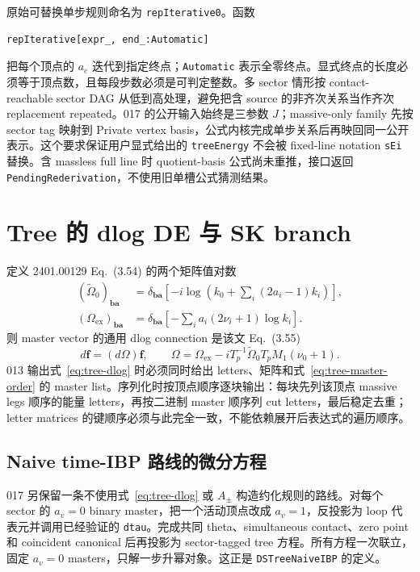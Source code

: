 ﻿\documentclass[a4paper,11pt]{article}
\begin{document}
原始可替换单步规则命名为 \texttt{repIterative0}。函数
\begin{verbatim}
repIterative[expr_, end_:Automatic]
\end{verbatim}
把每个顶点的 $a_e$ 迭代到指定终点；\texttt{Automatic} 表示全零终点。显式终点的长度必须等于顶点数，且每段步数必须是可判定整数。多 sector 情形按 contact-reachable sector DAG 从低到高处理，避免把含 source 的非齐次关系当作齐次 replacement repeated。017 的公开输入始终是三参数 $J$；massive-only family 先按 sector tag 映射到 Private vertex basis，公式内核完成单步关系后再映回同一公开表示。这个要求保证用户显式给出的 \texttt{treeEnergy} 不会被 fixed-line notation \texttt{sEi} 替换。含 massless full line 时 quotient-basis 公式尚未重推，接口返回 \texttt{PendingRederivation}，不使用旧单槽公式猜测结果。

\section{Tree 的 dlog DE 与 SK branch}

定义 2401.00129 Eq.~(3.54) 的两个矩阵值对数
\begin{align}
 (\widetilde\Omega_0)_{\bm b\bm a}
 &=\delta_{\bm b\bm a}\left[-i\log\left(k_0+\sum_i(2a_i-1)k_i\right)\right],\\
 (\Omega_{\mathrm{ex}})_{\bm b\bm a}
 &=\delta_{\bm b\bm a}\left[-\sum_i a_i(2\nu_i+1)\log k_i\right].
\end{align}
则 master vector 的通用 dlog connection 是该文 Eq.~(3.55)
\begin{equation}
 d\bm f=(d\Omega)\bm f,
 \qquad
 \Omega=\Omega_{\mathrm{ex}}
 -iT_p^{-1}\widetilde\Omega_0T_pM_1(\nu_0+1).
 \label{eq:tree-dlog}
\end{equation}
013 输出式~\eqref{eq:tree-dlog} 时必须同时给出 letters、矩阵和式~\eqref{eq:tree-master-order} 的 master list。序列化时按顶点顺序逐块输出：每块先列该顶点 massive legs 顺序的能量 letters，再按二进制 master 顺序列 cut letters，最后稳定去重；letter matrices 的键顺序必须与此完全一致，不能依赖展开后表达式的遍历顺序。

\subsection{Naive time-IBP 路线的微分方程}

017 另保留一条不使用式~\eqref{eq:tree-dlog} 或 $A_\pm$ 构造约化规则的路线。对每个 sector 的 $a_v=0$ binary master，把一个活动顶点改成 $a_v=1$，反投影为 loop 代表元并调用已经验证的 \texttt{dtau}。完成共同 theta、simultaneous contact、zero point 和 coincident canonical 后再投影为 sector-tagged tree 方程。所有方程一次联立，固定 $a_v=0$ masters，只解一步升幂对象。这正是 \texttt{DSTreeNaiveIBP} 的定义。
\end{document}
